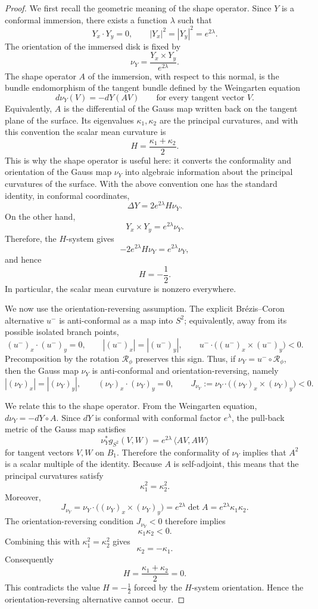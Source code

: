 \documentclass[11pt]{amsart}
\numberwithin{equation}{section}
\theoremstyle{remark}
\begin{document}
\begin{proof}
We first recall the geometric meaning of the shape operator.  Since $Y$ is a
conformal immersion, there exists a function $\lambda$ such that
\[
 Y_x\cdot Y_y=0,
 \qquad
 |Y_x|^2=|Y_y|^2=e^{2\lambda}.
\]
The orientation of the immersed disk is fixed by
\[
 \nu_Y=\frac{Y_x\times Y_y}{e^{2\lambda}}.
\]
The shape operator $A$ of the immersion, with respect to this normal, is the
bundle endomorphism of the tangent bundle defined by the Weingarten equation
\[
 d\nu_Y(V)=-dY(AV)
 \qquad\text{for every tangent vector }V.
\]
Equivalently, $A$ is the differential of the Gauss map written back on the
tangent plane of the surface.  Its eigenvalues $\kappa_1,\kappa_2$ are the
principal curvatures, and with this convention the scalar mean curvature is
\[
 H=\frac{\kappa_1+\kappa_2}{2}.
\]
This is why the shape operator is useful here: it converts the conformality and
orientation of the Gauss map $\nu_Y$ into algebraic information about the
principal curvatures of the surface.
With the above convention one has the standard identity, in conformal
coordinates,
\[
 \Delta Y=2e^{2\lambda}H\nu_Y.
\]
On the other hand,
\[
 Y_x\times Y_y=e^{2\lambda}\nu_Y.
\]
Therefore, the $H$-system gives
\[
 -2e^{2\lambda}H\nu_Y=e^{2\lambda}\nu_Y,
\]
and hence
\[
 H=-\frac12.
\]
In particular, the scalar mean curvature is nonzero everywhere.

We now use the orientation-reversing assumption.  The explicit Br\'ezis--Coron
alternative $u^-$ is anti-conformal as a map into $S^2$; equivalently, away
from its possible isolated branch points,
\[
 (u^-)_x\cdot (u^-)_y=0,
 \qquad
 |(u^-)_x|=|(u^-)_y|,
 \qquad
 u^-\cdot\bigl((u^-)_x\times (u^-)_y\bigr)<0.
\]
Precomposition by the rotation $\mathcal R_\phi$ preserves this sign.  Thus,
if $\nu_Y=u^-\circ\mathcal R_\phi$, then the Gauss map $\nu_Y$ is
anti-conformal and orientation-reversing, namely
\[
 |(\nu_Y)_x|=|(\nu_Y)_y|,
 \qquad
 (\nu_Y)_x\cdot(\nu_Y)_y=0,
 \qquad
 J_{\nu_Y}:=\nu_Y\cdot\bigl((\nu_Y)_x\times(\nu_Y)_y\bigr)<0.
\]

We relate this to the shape operator.  From the Weingarten equation,
$d\nu_Y=-dY\circ A$.  Since $dY$ is conformal with conformal factor
$e^\lambda$, the pull-back metric of the Gauss map satisfies
\[
 \nu_Y^*g_{S^2}(V,W)=e^{2\lambda}\,\langle AV,AW\rangle
\]
for tangent vectors $V,W$ on $B_1$.  Therefore the conformality of $\nu_Y$
implies that $A^2$ is a scalar multiple of the identity.  Because $A$ is
self-adjoint, this means that the principal curvatures satisfy
\[
 \kappa_1^2=\kappa_2^2.
\]
Moreover,
\[
 J_{\nu_Y}
 =\nu_Y\cdot\bigl((\nu_Y)_x\times(\nu_Y)_y\bigr)
 =e^{2\lambda}\det A
 =e^{2\lambda}\kappa_1\kappa_2.
\]
The orientation-reversing condition $J_{\nu_Y}<0$ therefore implies
\[
 \kappa_1\kappa_2<0.
\]
Combining this with $\kappa_1^2=\kappa_2^2$ gives
\[
 \kappa_2=-\kappa_1.
\]
Consequently
\[
 H=\frac{\kappa_1+\kappa_2}{2}=0.
\]
This contradicts the value $H=-\frac12$ forced by the $H$-system orientation.
Hence the orientation-reversing alternative cannot occur.
\end{proof}
\end{document}
